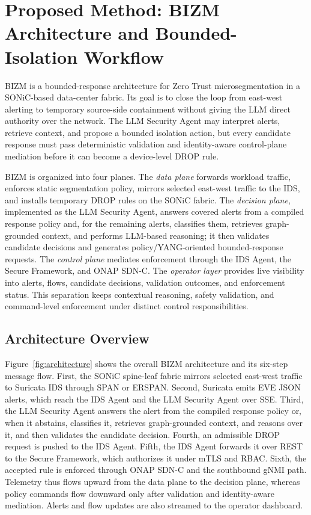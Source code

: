 \documentclass[final,5p]{elsarticle}
\begin{document}
\section{Proposed Method: BIZM Architecture and Bounded-Isolation Workflow}
\label{sec:method}

BIZM is a bounded-response architecture for Zero Trust microsegmentation in a SONiC-based data-center fabric. Its goal is to close the loop from east-west alerting to temporary source-side containment without giving the LLM direct authority over the network. The LLM Security Agent may interpret alerts, retrieve context, and propose a bounded isolation action, but every candidate response must pass deterministic validation and identity-aware control-plane mediation before it can become a device-level DROP rule.

BIZM is organized into four planes. The \emph{data plane} forwards workload traffic, enforces static segmentation policy, mirrors selected east-west traffic to the IDS, and installs temporary DROP rules on the SONiC fabric. The \emph{decision plane}, implemented as the LLM Security Agent, answers covered alerts from a compiled response policy and, for the remaining alerts, classifies them, retrieves graph-grounded context, and performs LLM-based reasoning; it then validates candidate decisions and generates policy/YANG-oriented bounded-response requests. The \emph{control plane} mediates enforcement through the IDS Agent, the Secure Framework, and ONAP SDN-C. The \emph{operator layer} provides live visibility into alerts, flows, candidate decisions, validation outcomes, and enforcement status. This separation keeps contextual reasoning, safety validation, and command-level enforcement under distinct control responsibilities.

\subsection{Architecture Overview}
\label{sec:arch_overview}

Figure~\ref{fig:architecture} shows the overall BIZM architecture and its six-step message flow. First, the SONiC spine-leaf fabric mirrors selected east-west traffic to Suricata IDS through SPAN or ERSPAN. Second, Suricata emits EVE JSON alerts, which reach the IDS Agent and the LLM Security Agent over SSE. Third, the LLM Security Agent answers the alert from the compiled response policy or, when it abstains, classifies it, retrieves graph-grounded context, and reasons over it, and then validates the candidate decision. Fourth, an admissible DROP request is pushed to the IDS Agent. Fifth, the IDS Agent forwards it over REST to the Secure Framework, which authorizes it under mTLS and RBAC. Sixth, the accepted rule is enforced through ONAP SDN-C and the southbound gNMI path. Telemetry thus flows upward from the data plane to the decision plane, whereas policy commands flow downward only after validation and identity-aware mediation. Alerts and flow updates are also streamed to the operator dashboard.
\end{document}
